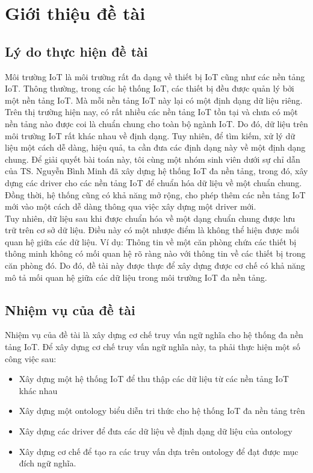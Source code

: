 \chapter{Giới thiệu đề tài}
\section{Lý do thực hiện đề tài}
Môi trường IoT là môi trường rất đa dạng về thiết bị IoT cũng như các nền tảng IoT. Thông thường, trong các hệ thống IoT, các thiết bị đều được quản lý bởi một nền tảng IoT. Mà mỗi nền tảng IoT này lại có một định dạng dữ liệu riêng. Trên thị trường hiện nay, có rất nhiều các nền tảng IoT tồn tại và chưa có một nền tảng nào được coi là chuẩn chung cho toàn bộ ngành IoT. Do đó, dữ liệu trên môi trường IoT rất khác nhau về định dạng. Tuy nhiên, để tìm kiếm, xử lý dữ liệu một cách dễ dàng, hiệu quả, ta cần đưa các định dạng này về một định dạng chung. Để giải quyết bài toán này, tôi cùng một nhóm sinh viên dưới sự chỉ dẫn của TS. Nguyễn Bình Minh đã xây dựng hệ thống IoT đa nền tảng, trong đó, xây dựng các driver cho các nền tảng IoT để chuẩn hóa dữ liệu về một chuẩn chung. Đồng thời, hệ thống cũng có khả năng mở rộng, cho phép thêm các nền tảng IoT mới vào một cách dễ dàng thông qua việc xây dựng một driver mới. \\
Tuy nhiên, dữ liệu sau khi được chuẩn hóa về một dạng chuẩn chung được lưu trữ trên cơ sở dữ liệu. Điều này có một nhược điểm là không thể hiện được mối quan hệ giữa các dữ liệu. Ví dụ: Thông tin về một căn phòng chứa các thiết bị thông minh không có mối quan hệ rõ ràng nào với thông tin về các thiết bị trong căn phòng đó. Do đó, đề tài này được thực để xây dựng được cơ chế có khả năng mô tả mối quan hệ giữa các dữ liệu trong môi trường IoT đa nền tảng.\\
\section{Nhiệm vụ của đề tài}
Nhiệm vụ của đề tài là xây dựng cơ chế truy vấn ngữ nghĩa cho hệ thống đa nền tảng IoT. Để xây dựng cơ chế truy vấn ngữ nghĩa này, ta phải thực hiện một số công việc sau:

\begin{itemize}
	\item Xây dựng một hệ thống IoT để thu thập các dữ liệu từ các nền tảng IoT khác nhau
	\item Xây dựng một ontology biểu diễn tri thức cho hệ thống IoT đa nền tảng trên
	\item Xây dựng các driver để đưa các dữ liệu về định dạng dữ liệu của ontology
	\item Xây dựng cơ chế để tạo ra các truy vấn dựa trên ontology để đạt được mục đích ngữ nghĩa.
\end{itemize}

